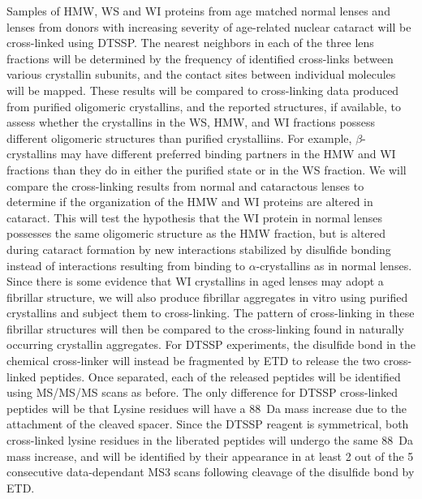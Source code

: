 \documentclass[arial,11pt]{article}
\begin{document}
Samples of HMW, WS and WI proteins from age matched normal lenses and lenses from donors with increasing severity of age-related nuclear cataract will be cross-linked using DTSSP. The nearest neighbors in each of the three lens fractions will be determined by the frequency of identified cross-links between various crystallin subunits, and the contact sites between individual molecules will be mapped.  These results will be compared to cross-linking data produced from purified oligomeric crystallins, and the reported structures, if available, to assess whether the crystallins in the WS, HMW, and WI fractions possess different oligomeric structures than purified crystalliins.  For example, $\beta$-crystallins may have different preferred binding partners in the HMW and WI fractions than they do in either the purified state or in the WS fraction.  We will compare the cross-linking results from normal and cataractous lenses to determine if the organization of the HMW and WI proteins are altered in cataract.  This will test the hypothesis that the WI protein in normal lenses possesses the same oligomeric structure as the HMW fraction, but is altered during cataract formation by new interactions stabilized by disulfide bonding instead of interactions resulting from binding to $\alpha$-crystallins as in normal lenses.   Since there is some evidence that WI crystallins in aged lenses may adopt a fibrillar structure, we will also produce fibrillar aggregates in vitro using purified crystallins and subject them to cross-linking.  The pattern of cross-linking in these fibrillar structures will then be compared to the cross-linking found in naturally occurring crystallin aggregates.  For DTSSP experiments, the disulfide bond in the chemical cross-linker will instead be fragmented by ETD to release the two cross-linked peptides.  Once separated, each of the released peptides will be identified using MS/MS/MS scans as before. The only difference for DTSSP cross-linked peptides will be that Lysine residues will have a 88~Da mass increase due to the attachment of the cleaved spacer. Since the DTSSP reagent is symmetrical, both cross-linked lysine residues in the liberated peptides will undergo the same 88~Da mass increase, and will be identified by their appearance in at least 2 out of the 5 consecutive data-dependant MS3 scans following cleavage of the disulfide bond by ETD.
\end{document}
